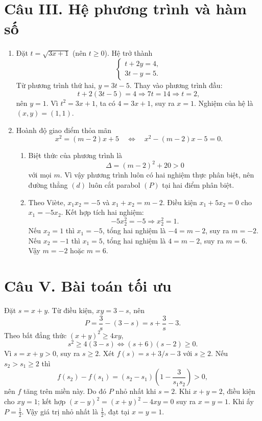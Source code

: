 \documentclass[12pt,a4paper]{article}
\begin{document}
\section*{Câu III. Hệ phương trình và hàm số}
\begin{enumerate}
\item Đặt $t=\sqrt{3x+1}$ (nên $t\ge0$). Hệ trở thành
\[
\begin{cases}
t+2y=4,\\
3t-y=5.
\end{cases}
\]
Từ phương trình thứ hai, $y=3t-5$. Thay vào phương trình đầu:
\[
t+2(3t-5)=4\Longrightarrow 7t=14\Longrightarrow t=2,
\]
nên $y=1$. Vì $t^2=3x+1$, ta có $4=3x+1$, suy ra $x=1$. Nghiệm của hệ là $\boxed{(x,y)=(1,1)}$.
\item Hoành độ giao điểm thỏa mãn
\[
x^2=(m-2)x+5\quad\Longleftrightarrow\quad x^2-(m-2)x-5=0.
\]
\begin{enumerate}
\item Biệt thức của phương trình là
\[
\Delta=(m-2)^2+20>0
\]
với mọi $m$. Vì vậy phương trình luôn có hai nghiệm thực phân biệt, nên đường thẳng $(d)$ luôn cắt parabol $(P)$ tại hai điểm phân biệt.
\item Theo Viète, $x_1x_2=-5$ và $x_1+x_2=m-2$. Điều kiện $x_1+5x_2=0$ cho $x_1=-5x_2$. Kết hợp tích hai nghiệm:
\[
-5x_2^2=-5\Longrightarrow x_2^2=1.
\]
Nếu $x_2=1$ thì $x_1=-5$, tổng hai nghiệm là $-4=m-2$, suy ra $m=-2$. Nếu $x_2=-1$ thì $x_1=5$, tổng hai nghiệm là $4=m-2$, suy ra $m=6$. Vậy $\boxed{m=-2\text{ hoặc }m=6}$.
\end{enumerate}
\end{enumerate}

\section*{Câu V. Bài toán tối ưu}
Đặt $s=x+y$. Từ điều kiện, $xy=3-s$, nên
\[
P=\frac3s-(3-s)=s+\frac3s-3.
\]
Theo bất đẳng thức $(x+y)^2\ge4xy$,
\[
s^2\ge4(3-s)\Longleftrightarrow (s+6)(s-2)\ge0.
\]
Vì $s=x+y>0$, suy ra $s\ge2$. Xét $f(s)=s+3/s-3$ với $s\ge2$. Nếu $s_2>s_1\ge2$ thì
\[
f(s_2)-f(s_1)=(s_2-s_1)\left(1-\frac3{s_1s_2}\right)>0,
\]
nên $f$ tăng trên miền này. Do đó $P$ nhỏ nhất khi $s=2$. Khi $x+y=2$, điều kiện cho $xy=1$; kết hợp $(x-y)^2=(x+y)^2-4xy=0$ suy ra $x=y=1$. Khi ấy $P=\frac12$. Vậy giá trị nhỏ nhất là $\boxed{\frac12}$, đạt tại $\boxed{x=y=1}$.
\end{document}
